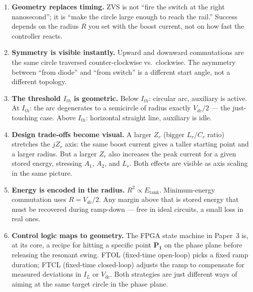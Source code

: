 \documentclass[12pt, a4paper]{article}
\newcommand{\Vdc}{V_{dc}}
\newcommand{\IL}{I_L}
\newcommand{\Ith}{I_{th}}
\begin{document}
\begin{enumerate}
    \item \textbf{Geometry replaces timing.}
          ZVS is not ``fire the switch at the right nanosecond''; it is
          ``make the circle large enough to reach the rail.''
          Success depends on the radius $R$ you set with the boost current,
          not on how fast the controller reacts.

    \item \textbf{Symmetry is visible instantly.}
          Upward and downward commutations are the same circle traversed
          counter-clockwise vs.\ clockwise.
          The asymmetry between ``from diode'' and ``from switch'' is a
          different start angle, not a different topology.

    \item \textbf{The threshold $\Ith$ is geometric.}
          Below $\Ith$: circular arc, auxiliary is active.
          At $\Ith$: the arc degenerates to a semicircle of radius
          exactly $\Vdc/2$ --- the just-touching case.
          Above $\Ith$: horizontal straight line, auxiliary is idle.

    \item \textbf{Design trade-offs become visual.}
          A larger $Z_r$ (bigger $L_r/C_r$ ratio) stretches the $jZ_r$
          axis: the same boost current gives a taller starting point and
          a larger radius.
          But a larger $Z_r$ also increases the peak current for a given
          stored energy, stressing $A_1$, $A_2$, and $L_r$.
          Both effects are visible as axis scaling in the same picture.

    \item \textbf{Energy is encoded in the radius.}
          $R^2 \propto E_\text{tank}$.
          Minimum-energy commutation uses $R = \Vdc/2$.
          Any margin above that is stored energy that must be recovered
          during ramp-down --- free in ideal circuits, a small loss in real
          ones.

    \item \textbf{Control logic maps to geometry.}
          The FPGA state machine in Paper~3 is, at its core, a recipe for
          hitting a specific point $\mathbf{P_1}$ on the phase plane before
          releasing the resonant swing.
          FTOL (fixed-time open-loop) picks a fixed ramp duration;
          FTCL (fixed-time closed-loop) adjusts the ramp to compensate for
          measured deviations in $\IL$ or $\Vdc$.
          Both strategies are just different ways of aiming at the same
          target circle in the phase plane.
\end{enumerate}
\end{document}
